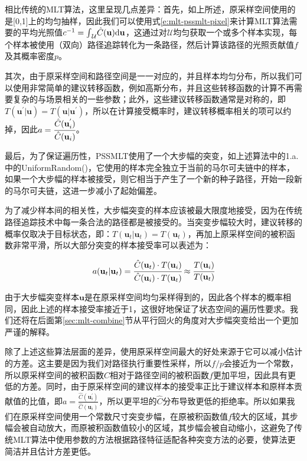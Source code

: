 相比传统的MLT算法，这里呈现几点差异：首先，如上所述，原采样空间使用的是[0,1]上的均匀抽样，因此我们可以使用式\ref{e:mlt-pssmlt-pixel}来计算MLT算法需要的平均光照值$c^{-1}={\rm \int}_{\mathcal{U}}\hat{C}(\mathbf{u}){\rm d}\mathbf{u}$，这通过对$\mathcal{U}$均匀获取一个或多个样本实现，每个样本被使用（双向）路径追踪转化为一条路径，然后计算该路径的光照贡献值$f$及其概率密度$p$。
	
其次，由于原采样空间和路径空间是一一对应的，并且样本均匀分布，所以我们可以使用非常简单的建议转移函数，例如高斯分布，并且这些转移函数的计算不再需要复杂的与场景相关的一些参数；此外，这些建议转移函数通常是对称的，即$T(\mathbf{u}^{'}|\mathbf{u})=T(\mathbf{u}|\mathbf{u}^{'})$，所以在计算接受概率时，建议转移概率相关的项可以约掉，因此$a= \cfrac{\hat{C}(\mathbf{u}^{'}_i)}{\hat{C}(\mathbf{u}_i)}$。

最后，为了保证遍历性，PSSMLT使用了一个大步幅的突变，如上述算法中的1.a.中的UniformRandom()，它使用的样本完全独立于当前的马尔可夫链中的样本，如果一个大步幅的样本被接受，则它相当于产生了一个新的种子路径，开始一段新的马尔可夫链，这进一步减小了起始偏差。

为了减少样本间的相关性，大步幅突变的样本应该被最大限度地接受，因为在传统路径追踪技术中每一条合法的路径都是被接受的。当突变步幅较大时，建议转移的概率仅取决于目标状态，即：$T(\mathbf{u}_t|\mathbf{u}_t)=T(\mathbf{u}_t)$，再加上原采样空间的被积函数非常平滑，所以大部分突变的样本接受率可以表述为：

\begin{equation}
	a(\mathbf{u}_t|\mathbf{u}_t)= \cfrac{\hat{C}(\mathbf{u}_t)\cdot T(\mathbf{u}_i)}{\hat{C}(\mathbf{u}_i)\cdot T(\mathbf{u}_t)}\approx \cfrac{T(\mathbf{u}_i)}{T(\mathbf{u}_t)}
\end{equation}

\noindent 由于大步幅突变样本$\mathbf{u}$是在原采样空间均匀采样得到的，因此各个样本的概率相同，因此上述的样本接受率接近于1，这很好地保证了状态空间的遍历性要求。我们还将在后面第\ref{sec:mlt-combine}节从平行回火的角度对大步幅突变给出一个更加严谨的解释。

除了上述这些算法层面的差异，使用原采样空间最大的好处来源于它可以减小估计的方差。这主要是因为我们对路径执行重要性采样，所以$f/p$会接近为一个常数，所以原采样空间的被积函数$\hat{C}$相对于路径空间的被积函数$f$更加平坦，因此具有更低的方差。同时，由于原采样空间的建议样本的接受率正比于建议样本和原样本贡献值的比值，即$a=\frac{\hat{C}(\mathbf{u}^{'}_i)}{\hat{C}(\mathbf{u}_i)}$，所以更平坦的$\hat{C}$分布导致更低的拒绝率。所以如果我们在原采样空间使用一个常数尺寸突变步幅，在原被积函数值$f$较大的区域，其步幅会被自动放大，而原被积函数值较小的区域，其步幅会被自动缩小，这避免了传统MLT算法中使用参数的方法根据路径特征适配各种突变方法的必要，使算法更简洁并且估计方差更低。

